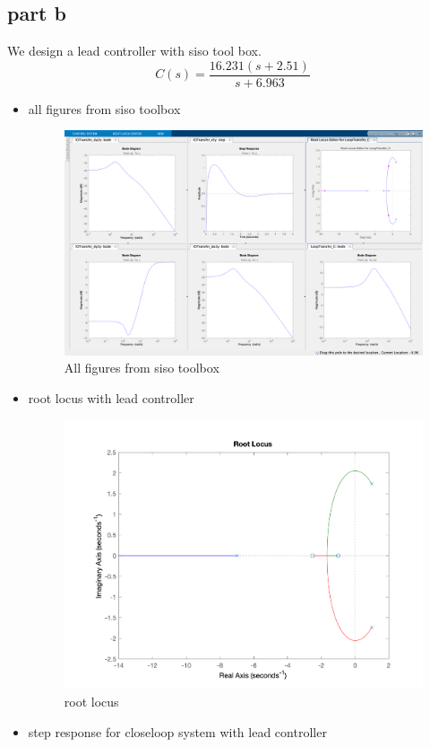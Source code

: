 \subsection{part b}
We design a lead controller with siso tool box.
$$
C(s) = \dfrac{16.231(s + 2.51)}{s + 6.963}
$$
\begin{itemize}
	\item all figures from siso toolbox
	\begin{figure}[H]
		\caption{All figures from siso toolbox}
		\centering
		\includegraphics[width=16cm]{../Figure/Q1/Q1_b/siso_all.png}
	\end{figure}
	\newpage
	\item root locus with lead controller
	\begin{figure}[H]
		\caption{root locus}
		\centering
		\includegraphics[width=12cm]{../Figure/Q1/Q1_b/rlocus.png}
	\end{figure}
	\item step response for closeloop system with lead controller

\end{itemize}
